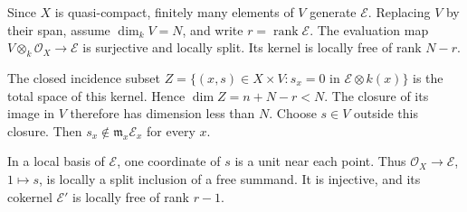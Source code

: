 Since $X$ is quasi-compact, finitely many elements of $V$ generate $\mathcal E$. Replacing $V$ by their span, assume $\dim_k V=N$, and write $r=\operatorname{rank}\mathcal E$. The evaluation map $V\otimes_k\mathcal O_X\to\mathcal E$ is surjective and locally split. Its kernel is locally free of rank $N-r$.

The closed incidence subset $Z=\{(x,s)\in X\times V:s_x=0\text{ in }\mathcal E\otimes k(x)\}$ is the total space of this kernel. Hence $\dim Z=n+N-r<N$. The closure of its image in $V$ therefore has dimension less than $N$. Choose $s\in V$ outside this closure. Then $s_x\notin\mathfrak m_x\mathcal E_x$ for every $x$.

In a local basis of $\mathcal E$, one coordinate of $s$ is a unit near each point. Thus $\mathcal O_X\to\mathcal E$, $1\mapsto s$, is locally a split inclusion of a free summand. It is injective, and its cokernel $\mathcal E'$ is locally free of rank $r-1$.
